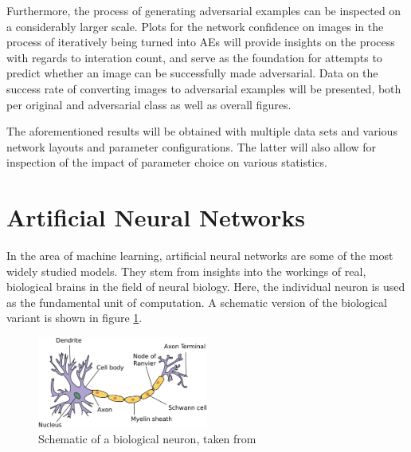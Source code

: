 \documentclass[11pt, a4paper]{article}
\begin{document}
Furthermore, the process of generating adversarial examples can be inspected on a considerably larger scale. Plots for the network confidence on images in the process of iteratively being turned into AEs will provide insights on the process with regards to interation count, and serve as the foundation for attempts to predict whether an image can be successfully made adversarial. Data on the success rate of converting images to adversarial examples will be presented, both per original and adversarial class as well as overall figures.

The aforementioned results will be obtained with multiple data sets and various network layouts and parameter configurations. The latter will also allow for inspection of the impact of parameter choice on various statistics.











\newpage
\section{Artificial Neural Networks}
\label{sec:artificial-neural-networks}
In the area of machine learning, artificial neural networks are some of the most widely studied models. They stem from insights into the workings of real, biological brains in the field of neural biology. Here, the individual neuron is used as the fundamental unit of computation. A schematic version of the biological variant is shown in figure \ref{fig:biological-neuron-schematic}.

\begin{figure}[htb]
	\centering
	\includegraphics[width=0.5\textwidth]{images/biological_neuron.png}
	\caption{Schematic of a biological neuron, taken from \cite{biological-neuron-schematic}}
	\label{fig:biological-neuron-schematic}
\end{figure}
\end{document}
